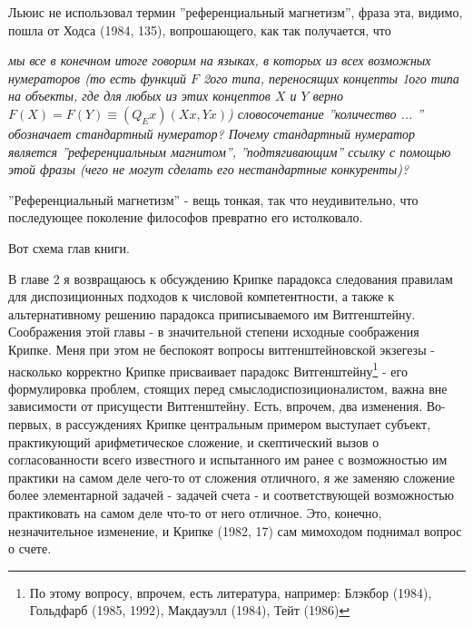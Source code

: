 \documentclass[12pt]{book}
\begin{document}
Льюис не использовал термин ''референциальный магнетизм'', фраза эта, видимо, пошла от Ходса (1984, 135), вопрошающего, как так получается, что

\smallskip

\textit{мы все в конечном итоге говорим на языках, в которых из всех возможных нумераторов (то есть функций \begin{math}F\end{math} 2ого типа, переносящих концепты 1ого типа на объекты, где для любых из этих концептов \begin{math}X\end{math} и \begin{math}Y\end{math} верно \begin{math}F(X)=F(Y)\equiv (Q_{E}x)(Xx, Yx)\end{math}) словосочетание ''количество ... '' обозначает стандартный нумератор? Почему стандартный нумератор является ''референциальным магнитом'', ''подтягивающим'' ссылку с помощью этой фразы (чего не могут сделать его нестандартные конкуренты)?}

\smallskip

''Референциальный магнетизм'' - вещь тонкая, так что неудивительно, что последующее поколение философов превратно его истолковало.

Вот схема глав книги.

В главе 2 я возвращаюсь к обсуждению Крипке парадокса следования правилам для диспозиционных подходов к числовой компетентности, а также к альтернативному решению парадокса приписываемого им Витгенштейну. Соображения этой главы - в значительной степени исходные соображения Крипке. Меня при этом не беспокоят вопросы витгенштейновской экзегезы - насколько корректно Крипке присваивает парадокс Витгенштейну\footnote{По этому вопросу, впрочем, есть литература, например: Блэкбор (1984), Гольдфарб (1985, 1992), Макдауэлл (1984), Тейт (1986)} - его формулировка проблем, стоящих перед смыслодиспозиционалистом, важна вне зависимости от присущести Витгенштейну. Есть, впрочем, два изменения. Во-первых, в рассуждениях Крипке центральным примером выступает субъект, практикующий арифметическое сложение, и скептический вызов о согласованности всего известного и испытанного им ранее с возможностью им практики на самом деле чего-то от сложения отличного, я же заменяю сложение более элементарной задачей - задачей счета - и соответствующей возможностью практиковать на самом деле что-то от него отличное. Это, конечно, незначительное изменение, и Крипке (1982, 17) сам мимоходом поднимал вопрос о счете.
\end{document}
